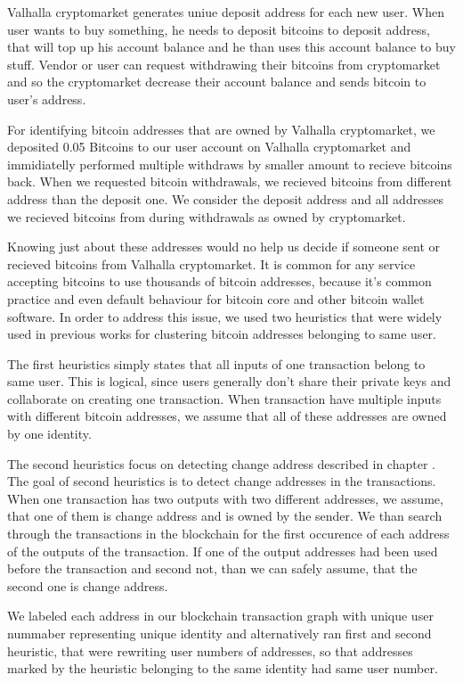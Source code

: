 \documentclass[
  digital, %
  table,   %
  lof,     %
  lot,     %
  oneside
]{fithesis3}
\begin{document}
Valhalla cryptomarket generates uniue deposit address for each new user.
When user wants to buy something, he needs to deposit bitcoins to deposit address,
that will top up his account balance and he than uses this account balance to buy stuff.
Vendor or user can request withdrawing their bitcoins from cryptomarket and so
the cryptomarket decrease their account balance and sends bitcoin to user's address.

For identifying bitcoin addresses that are owned by Valhalla cryptomarket, we 
deposited 0.05 Bitcoins to our user account on Valhalla cryptomarket and immidiatelly
performed multiple withdraws by smaller amount to recieve bitcoins back.
When we requested bitcoin withdrawals, we recieved bitcoins from different address
than the deposit one. We consider the deposit address and all addresses we recieved
bitcoins from during withdrawals as owned by cryptomarket.

Knowing just about these addresses would no help us decide
if someone sent or recieved bitcoins from Valhalla cryptomarket.
It is common for any service accepting bitcoins to
use thousands of bitcoin addresses, because it's common practice and even default behaviour for
bitcoin core and other bitcoin wallet software.
In order to address this issue, we used two heuristics that were widely used
in previous works \parencite{androulaki2013evaluating}\parencite{reid2013analysis}
for clustering bitcoin addresses belonging to same user.

The first heuristics simply states that all inputs of one transaction belong to same user. This is logical,
since users generally don't share their private keys and collaborate on creating one transaction.
When transaction have multiple inputs with different bitcoin addresses, we assume that all of these addresses are owned by
one identity.

The second heuristics focus on detecting change address described in chapter \label{btcadd}.
The goal of second heuristics is to detect change addresses in the transactions.
When one transaction has two outputs with two different addresses, we assume, that one of them is change
address and is owned by the sender.
We than search through the transactions in the blockchain for the first occurence of each address of the outputs of the 
transaction. If one of the output addresses had been used before the transaction and second not,
than we can safely assume, that the second one is change address\parencite{androulaki2013evaluating}.

We labeled each address in our blockchain transaction graph with unique user nummaber representing
unique identity and 
alternatively ran first and second heuristic, that were rewriting user numbers of addresses, so that 
addresses marked by the heuristic belonging to the same identity had same user number.
\end{document}
